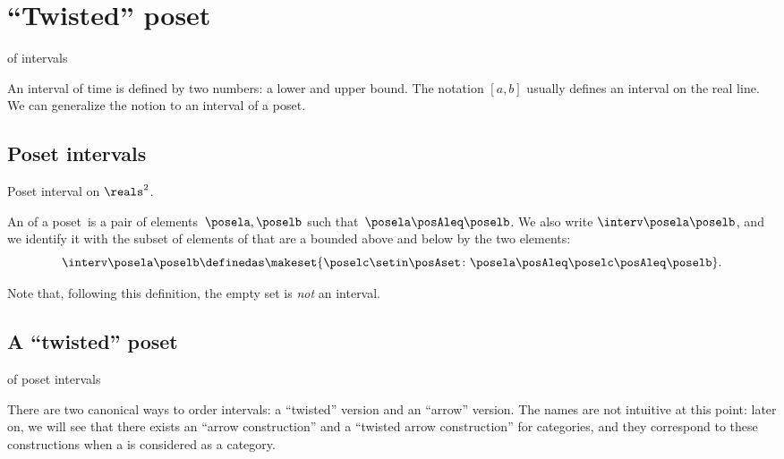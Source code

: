 
\section{``Twisted''  poset} of intervals

An interval of time is defined by two numbers: a lower and upper bound.
The notation $[a,b]$ usually defines an interval on the real line.
We can generalize the notion to an interval of a poset.

\subsection{Poset intervals}
\begin{marginfigure}
    \centering
    \caption{Poset interval on $\reals^2$.}
    \label{fig:int_posets}
\end{marginfigure}

\begin{definition}[Interval]
    \label{def:interval}
    An  of a poset~\posA is a pair of elements~$\posela, \poselb$ such that~$\posela \posAleq \poselb$.
    We also write $\interv \posela \poselb$, and we identify it with the subset of elements of \posA that are a bounded above and below by the two elements:
    \begin{equation}\label{eq:interval}
        \interv \posela \poselb
        \definedas
        \makeset{
            \poselc \setin \posAset \colon
            \posela \posAleq \poselc \posAleq \poselb
        }.
    \end{equation}
\end{definition}

Note that, following this definition, the empty set is \emph{not} an interval.

\subsection{A ``twisted''  poset} of  poset intervals

There are two canonical ways to order  intervals: a ``twisted'' version and an ``arrow'' version.
The names are not intuitive at this point: later on, we will see that there exists an ``arrow construction'' and a ``twisted arrow construction'' for categories, and they correspond to these constructions when a  is considered as a category.

